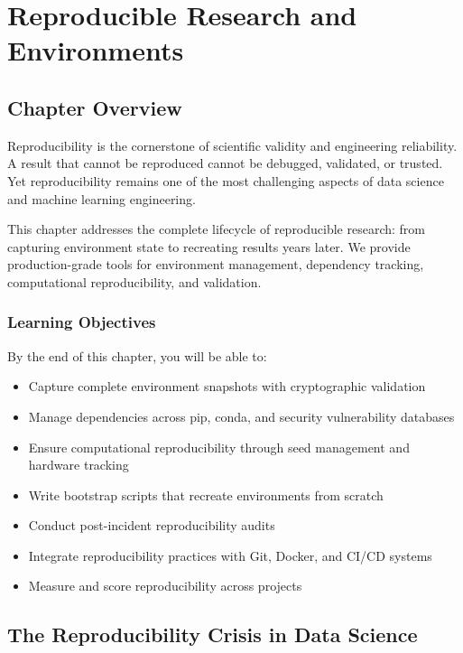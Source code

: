 \chapter{Reproducible Research and Environments}
\label{ch:reproducibility}

\section{Chapter Overview}

Reproducibility is the cornerstone of scientific validity and engineering reliability. A result that cannot be reproduced cannot be debugged, validated, or trusted. Yet reproducibility remains one of the most challenging aspects of data science and machine learning engineering.

This chapter addresses the complete lifecycle of reproducible research: from capturing environment state to recreating results years later. We provide production-grade tools for environment management, dependency tracking, computational reproducibility, and validation.

\subsection{Learning Objectives}

By the end of this chapter, you will be able to:

\begin{itemize}
    \item Capture complete environment snapshots with cryptographic validation
    \item Manage dependencies across pip, conda, and security vulnerability databases
    \item Ensure computational reproducibility through seed management and hardware tracking
    \item Write bootstrap scripts that recreate environments from scratch
    \item Conduct post-incident reproducibility audits
    \item Integrate reproducibility practices with Git, Docker, and CI/CD systems
    \item Measure and score reproducibility across projects
\end{itemize}

\section{The Reproducibility Crisis in Data Science}

